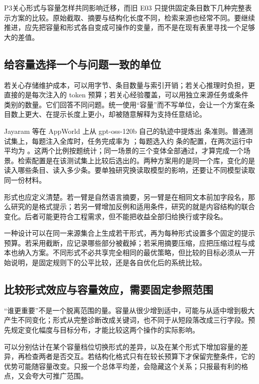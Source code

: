 P3关心形式与容量怎样共同影响迁移，而旧 E03 只提供固定条目数下几种完整表示方案的比较。原始截取、摘要与结构化长度不同，检索来源也经常不同。要继续推进，应先把容量和形式各自变成可操作的变量，而不是在现有表里寻找一个足够大的差值。

\subsection{给容量选择一个与问题一致的单位}

若关心存储维护成本，可以用字节、条目数量与索引开销；若关心推理时负担，更直接的是每次注入的 token 预算；若关心经验覆盖，可以用独立来源任务或条件类别的数量。它们回答不同问题。统一使用“容量”而不写单位，会让一个方案在条目数上更大、在提示长度上更小，却被随意解释为支持任意结论。

Jayaram 等在 AppWorld 上从 gpt-oss-120b 自己的轨迹中提炼出  条准则\cite{self-distilled-memory-2611}。普通测试集上，每题注入全库时，任务完成率为 ；每题选入约  条的配置，在两次运行中平均为 。这两个比例按题统计；同一场景的三个变体全部通过，才算完成一个场景。检索配置是在该测试集上比较后选出的。两种方案用的是同一个库，变化的是读入哪些条目、读入多少条。要单独研究换读取模型的影响，还要让不同模型读取同一份材料。

形式也应定义清楚。若一臂是自然语言摘要，另一臂是在相同文本前加字段名，那么研究的是格式提示；若另一臂增加反例和适用条件，研究的就是内容结构的联合变化。后者可能更符合工程需求，但不能把收益全部归给换行或字段名。

一种设计可以在同一来源集合上生成若干形式，再为每种形式设置多个固定的提示预算。若采用截断，应记录哪些部分被截掉；若采用摘要压缩，应把压缩过程与成本也纳入方案。不同形式不必共享完全相同的最优策略，但比较的目标必须从一开始说明，是固定规则下的公平比较，还是各自优化后的系统比较。

\subsection{比较形式效应与容量效应，需要固定参照范围}

“谁更重要”不是一个脱离范围的量。容量从很少增到适中，可能与从适中增到极大产生不同变化；形式从完整诊断改成关键词，也不同于从短段落改成三行字段。预先规定变化幅度与目标分布，才能比较这两个操作的实际影响。

可以分别估计在某个容量档位切换形式的差异，以及在某个形式下增加容量的差异，再检查两者是否交互。若结构化格式只有在较长预算下才保留完整条件，它的优势可能随容量改变。只报一个总体平均差，会隐藏这个关系；只报最有利的格点，又会夸大可推广范围。

